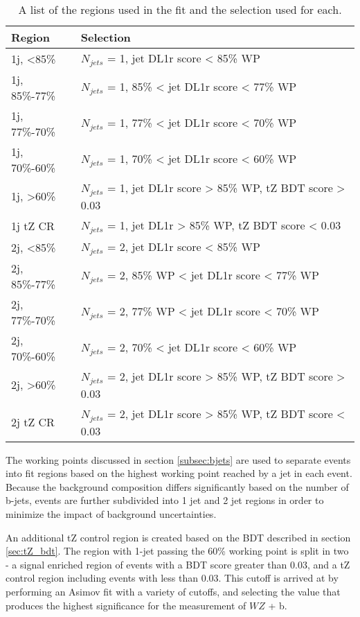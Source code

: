 \begin{table}[h]
\centering
\caption{A list of the regions used in the fit and the selection used for each.}
\begin{tabular}{l|l}
\hline\hline
Region & Selection            \\
\hline
\hline
1j, <85\%       & $N_{jets}$ = 1, jet DL1r score < 85\% WP            \\
1j, 85\%-77\%   & $N_{jets}$ = 1, 85\% < jet DL1r score < 77\% WP                    \\
1j, 77\%-70\%   & $N_{jets}$ = 1, 77\% < jet DL1r score < 70\% WP                    \\
1j, 70\%-60\%   & $N_{jets}$ = 1, 70\% < jet DL1r score < 60\% WP                    \\
1j, >60\%       & $N_{jets}$ = 1, jet DL1r score > 85\% WP, tZ BDT score > 0.03 \\
1j tZ CR        & $N_{jets}$ = 1, jet DL1r > 85\% WP, tZ BDT score < 0.03 \\
2j, <85\%       & $N_{jets}$ = 2, jet DL1r score < 85\% WP                    \\
2j, 85\%-77\%   & $N_{jets}$ = 2, 85\% WP < jet DL1r score < 77\% WP                 \\
2j, 77\%-70\%   & $N_{jets}$ = 2, 77\% WP < jet DL1r score < 70\% WP                 \\
2j, 70\%-60\%   & $N_{jets}$ = 2, 70\% < jet DL1r score < 60\% WP                     \\
2j, >60\%       & $N_{jets}$ = 2, jet DL1r score > 85\% WP, tZ BDT score > 0.03 \\
2j tZ CR        & $N_{jets}$ = 2, jet DL1r score > 85\% WP, tZ BDT score < 0.03 \\
\hline\hline
\end{tabular}
\label{tab:regions}
\end{table}

The working points discussed in section \ref{subsec:bjets} are used to separate events into fit regions based on the highest working point reached by a jet in each event. Because the background composition differs significantly based on the number of b-jets, events are further subdivided into 1 jet and 2 jet regions in order to minimize the impact of background uncertainties.

An additional tZ control region is created based on the BDT described in section \ref{sec:tZ_bdt}. The region with 1-jet passing the 60\% working point is split in two - a signal enriched region of events with a BDT score greater than 0.03, and a tZ control region including events with less than 0.03. This cutoff is arrived at by performing an Asimov fit with a variety of cutoffs, and selecting the value that produces the highest significance for the measurement of $WZ$ + b.

